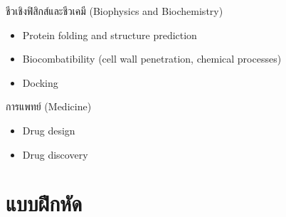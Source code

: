 ชีวเชิงฟิสิกส์และชีวเคมี (Biophysics and Biochemistry)

\begin{itemize}
    \item Protein folding and structure prediction
    \item Biocombatibility (cell wall penetration, chemical processes)
    \item Docking
\end{itemize}

การแพทย์ (Medicine)

\begin{itemize}
    \item Drug design 
    \item Drug discovery
\end{itemize}

\section{แบบฝึกหัด}


